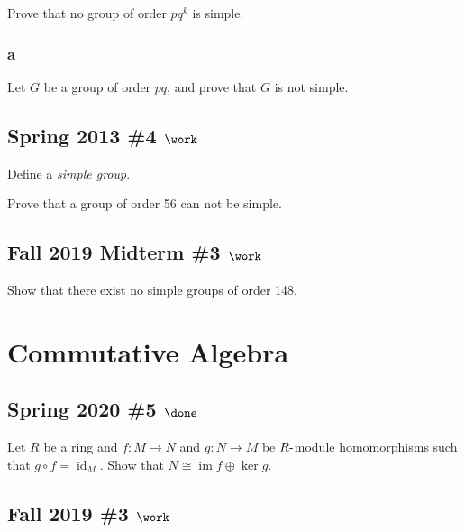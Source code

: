 Prove that no group of order \(pq^k\) is simple.

\hypertarget{a-30}{%
\subsubsection{a}\label{a-30}}

Let \(G\) be a group of order \(pq\), and prove that \(G\) is not
simple.

\hypertarget{spring-2013-4-work}{%
\subsection{\texorpdfstring{Spring 2013 \#4
\(\work\)}{Spring 2013 \#4 \textbackslash work}}\label{spring-2013-4-work}}

Define a \emph{simple group}.

Prove that a group of order 56 can not be simple.

\hypertarget{fall-2019-midterm-3-work}{%
\subsection{\texorpdfstring{Fall 2019 Midterm \#3
\(\work\)}{Fall 2019 Midterm \#3 \textbackslash work}}\label{fall-2019-midterm-3-work}}

Show that there exist no simple groups of order 148.

\hypertarget{commutative-algebra}{%
\section{Commutative Algebra}\label{commutative-algebra}}

\hypertarget{spring-2020-5-done}{%
\subsection{\texorpdfstring{Spring 2020 \#5
\(\done\)}{Spring 2020 \#5 \textbackslash done}}\label{spring-2020-5-done}}

Let \(R\) be a ring and \(f: M\to N\) and \(g: N\to M\) be
\(R{\hbox{-}}\)module homomorphisms such that
\(g\circ f = \operatorname{id}_M\). Show that
\(N \cong \operatorname{im}f \oplus \ker g\).

\hypertarget{fall-2019-3-work}{%
\subsection{\texorpdfstring{Fall 2019 \#3
\(\work\)}{Fall 2019 \#3 \textbackslash work}}\label{fall-2019-3-work}}

